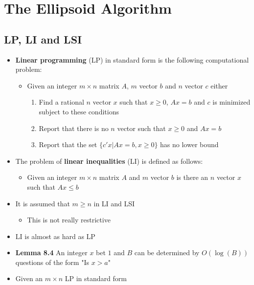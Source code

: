 \documentclass[11pt]{article}
\begin{document}
\section{The Ellipsoid Algorithm}
\label{sec:org9a8aa86}
\subsection{LP, LI and LSI}
\label{sec:org0494779}
\begin{itemize}
\item \textbf{Linear programming} (LP) in standard form is the following computational problem:
\begin{itemize}
\item Given an integer \(m \times n\) matrix \(A\), \(m\) vector \(b\) and \(n\) vector \(c\) either
\begin{enumerate}
\item Find a rational \(n\) vector \(x\) such that \(x \geq 0\), \(Ax = b\) and \(c\) is minimized subject to these conditions
\item Report that there is no \(n\) vector such that \(x \geq 0\) and \(Ax = b\)
\item Report that the set \(\{c'x | Ax = b, x \geq 0\}\) has no lower bound
\end{enumerate}
\end{itemize}

\item The problem of \textbf{linear inequalities} (LI) is defined as follows:
\begin{itemize}
\item Given an integer \(m \times n\) matrix \(A\) and \(m\) vector \(b\) is there an \(n\) vector \(x\) such that \(Ax \leq b\)
\end{itemize}

\item It is assumed that \(m \geq n\) in LI and LSI
\begin{itemize}
\item This is not really restrictive
\end{itemize}

\item LI is almost as hard as LP

\item \textbf{Lemma 8.4} An integer \(x\) bet \(1\) and \(B\) can be determined by \(O(\log(B))\) questions of the form "Is \(x>a\)"

\item Given an \(m \times n\) LP in standard form
\end{itemize}
\end{document}
